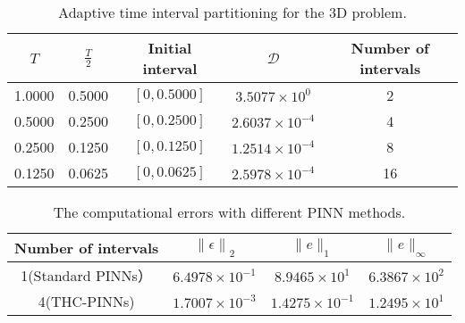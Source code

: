 \documentclass[preprint]{elsarticle}
\numberwithin{table}{section}
\numberwithin{equation}{section}
\numberwithin{figure}{section}
\begin{document}
\begin{CJK}{UTF8}{gbsn}



\begin{table}[htbp]
    \centering
    \begin{tabular}{ccccc}
        \hline
  $T$ & $\frac{T}{2}$ &  Initial interval  & $\mathcal{D}$ &Number of intervals\\ 
        \hline
       1.0000 & 0.5000 & $[0,0.5000]$ & $3.5077 \times 10^{0}$  & 2 \\
        0.5000 & 0.2500 & $[0,0.2500]$ & $2.6037 \times 10^{-4}$ & 4 \\
        0.2500 & 0.1250 & $[0,0.1250]$ & $1.2514 \times 10^{-4}$ & 8 \\
        0.1250 & 0.0625 & $[0,0.0625]$ & $2.5978 \times 10^{-4}$ & 16 \\
        \hline
    \end{tabular}
    \caption{Adaptive time interval partitioning for the 3D problem.}
    \label{Heat_adaTTTTTT}
\end{table}


\begin{table}[htbp]
    \centering
    \begin{tabular}{c|ccc}
        \hline
        Number of intervals  &  $\left\|\epsilon\right\|_{2}$  & $\|e\|_1 $ & $\|e\|_\infty$ \\ 
        \hline
1(Standard PINNs）& $6.4978 \times 10^{-1}$ & $8.9465 \times 10^{1}$ & $6.3867 \times 10^{2}$ \\
        4(THC-PINNs) & $1.7007 \times 10^{-3}$ & $1.4275 \times 10^{-1}$ & $1.2495 \times 10^{1}$ \\
        \hline
    \end{tabular}
    \caption{The computational errors with different PINN methods.}
    \label{Heat_fix_multgroup}
\end{table}





\end{CJK}
\end{document}
